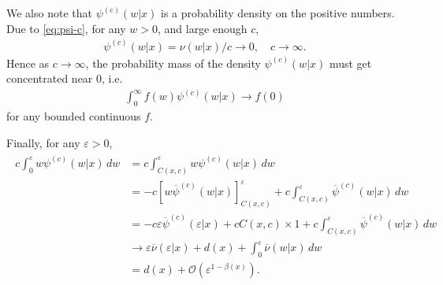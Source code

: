 \documentclass[a4paper,12pt]{elsarticle}
\numberwithin{equation}{section}
\theoremstyle{plain}
\theoremstyle{definition}
\theoremstyle{remark}
\numberwithin{equation}{section}
\newcommand{\1}{\mathbf 1}
\begin{document}
We also note that $\psi^{(c)}(w|x)$ is a probability density on the positive 
numbers.  Due to \eqref{eq:psi-c}, for any $w > 0$, and large enough $c$,
\begin{align}
  \psi^{(c)}(w|x) = \nu(w|x) / c \to 0, \quad c \to \infty. 
\end{align}  
Hence as $c \to \infty$, the probability mass of the density 
$\psi^{(c)}(w|x)$ must get concentrated near $0$, i.e.\ 
\begin{align} \label{eq:to-delta}
  \int_0^\infty f(w) \psi^{(c)}(w|x) \to f(0)
\end{align}
for any bounded continuous $f$.

Finally, for any $\varepsilon > 0$,
\begin{align}
\label{eq:local-psi}
\begin{split}
  c \int_0^\varepsilon w \psi^{(c)}(w|x) \,dw
  &= c \int_{C(x,c)}^\varepsilon w \psi^{(c)}(w|x) \,dw
  \\
  &= -c\left[w\overline \psi^{(c)}(w|x)\right]^\varepsilon_{C(x,c)}
  + c \int_{C(x,c)}^\varepsilon \overline \psi^{(c)}(w|x)\,dw
  \\
  &= -c\varepsilon \overline \psi^{(c)}(\varepsilon|x)
  + c C(x,c) \times 1
  + c \int_{C(x,c)}^\varepsilon \overline \psi^{(c)}(w|x)\,dw
  \\
  &\to \varepsilon \overline\nu(\varepsilon | x)
  + d(x) + \int_0^\varepsilon \overline \nu(w|x)\,dw
  \\
  &= d(x) + \mathcal O(\varepsilon^{1-\beta(x)}).
\end{split}
\end{align}
\end{document}
